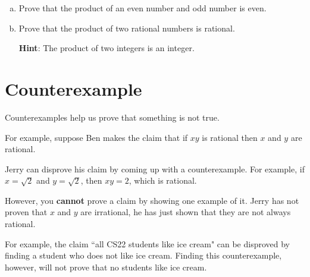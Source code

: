 \documentclass[12pt,letterpaper]{article}
\newcommand\hint[1]{\textbf{Hint}: #1}
\newif\ifsol
\begin{document}
      \begin{enumerate}[a.]
        \item Prove that the product of an even number and odd number is even. 

        \begin{mdframed}
		\ifsol  
		Consider $n$ odd and $m$ even. $n = 2a+1$ and $m = 2b$.

		Their product is $(2a + 1)(2b) = 4ab + 2b = 2(2ab + b)$.

		Since $2ab + b$ is an integer their product is even.
		\else
        \vspace{4cm}
		\fi
        \end{mdframed}
		

        \item Prove that the product of two rational numbers is rational.
		
		\hint{The product of two integers is an integer.}

        \begin{mdframed}
		\ifsol
		Consider $n = \frac{a}{b}$ and $m = \frac{c}{d}$.

		Their product is $nm = \frac{ac}{bd}$. Since the product of two integers is an integer, we have just expressed $nm$ as the ratio of two integers. Therefore $nm$ is rational.
	 	\else
        \vspace{4cm}
		\fi
        \end{mdframed}

      \end{enumerate}

      \section*{Counterexample}

      Counterexamples help us prove that something is not true.

      For example, suppose Ben makes the claim that if $xy$ is rational then $x$ and $y$ are rational.

      Jerry can disprove his claim by coming up with a counterexample. For example, if $x = \sqrt{2}$ and $y = \sqrt{2}$, then $xy = 2$, which is rational. 

      However, you \textbf{cannot} prove a claim by showing one example of it. Jerry has not proven that $x$ and $y$ are irrational, he has just shown that they are not always rational.

      For example, the claim ``all CS22 students like ice cream" can be disproved by finding a student who does not like ice cream. Finding this counterexample, however, will not prove that no students like ice cream.
\end{document}
